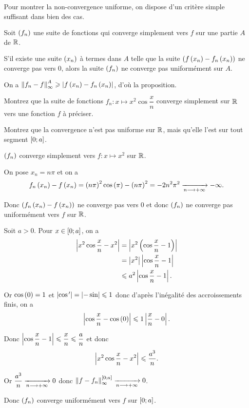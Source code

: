 Pour montrer la non-convergence uniforme, on dispose d'un critère simple suffisant dans bien des cas.

\begin{prop}
Soit \(\left(f_n\right)\) une suite de fonctions qui converge simplement vers \(f\) sur une partie \(A\) de \(\mathbb{R}\).

S'il existe une suite \(\left(x_n\right)\) à termes dans \(A\) telle que la suite \(\left(f\left(x_n\right)-f_n\left(x_n\right)\right)\) ne converge pas vers \(0\), alors la suite \(\left(f_n\right)\) ne converge pas uniformément sur \(A\).
\end{prop}

\begin{dem}
On a \(\norme{f_n-f}_\infty^A\geq\abs{f\paren{x_n}-f_n\paren{x_n}}\), d'où la proposition.
\end{dem}

\begin{exo}
Montrez que la suite de fonctions \(f_n:x\mapsto x^2\cos\dfrac{x}{n}\) converge simplement sur \(\mathbb{R}\) vers une fonction \(f\) à préciser.

Montrez que la convergence n'est pas uniforme sur \(\mathbb{R}\), mais qu'elle l'est sur tout segment \(\left[0;a\right]\).
\end{exo}

\begin{corr}
\(\left(f_n\right)\) converge simplement vers \(f:x\mapsto x^2\) sur \(\mathbb{R}\).

On pose \(x_n=n\pi\) et on a \[f_n\left(x_n\right)-f\left(x_n\right)=\left(n\pi\right)^2\cos\left(\pi\right)-\left(n\pi\right)^2=-2n^2\pi^2\xrightarrow[n\longrightarrow+\infty]{}-\infty.\]

Donc \(\left(f_n\left(x_n\right)-f\left(x_n\right)\right)\) ne converge pas vers \(0\) et donc \(\left(f_n\right)\) ne converge pas uniformément vers \(f\) sur \(\mathbb{R}\).

Soit \(a>0\). Pour \(x\in\left[0;a\right]\), on a \[\begin{aligned}
\left\lvert x^2\cos\dfrac{x}{n}-x^2\right\rvert&=\left\lvert x^2\left(\cos\dfrac{x}{n}-1\right)\right\rvert \\
&=\left\lvert x^2\right\rvert\left\lvert\cos\dfrac{x}{n}-1\right\rvert \\
&\leqslant a^2\left\lvert\cos\dfrac{x}{n}-1\right\rvert.
\end{aligned}\]

Or \(\cos\left(0\right)=1\) et \(\left\lvert\cos^{\,\prime}\right\rvert=\left\lvert-\sin\right\rvert\leqslant1\) donc d'après l'inégalité des accroissements finis, on a \[\left\lvert\cos\dfrac{x}{n}-\cos\left(0\right)\right\rvert\leqslant1\left\lvert\dfrac{x}{n}-0\right\rvert.\]

Donc \(\left\lvert\cos\dfrac{x}{n}-1\right\rvert\leqslant\dfrac{x}{n}\leqslant\dfrac{a}{n}\) et donc \[\left\lvert x^2\cos\dfrac{x}{n}-x^2\right\rvert\leqslant\dfrac{a^3}{n}.\]

Or \(\dfrac{a^3}{n}\xrightarrow[n\longrightarrow+\infty]{}0\) donc \(\norme{f-f_n}_\infty^{\intervii{0}{a}}\tendqd{n\to\pinf}0\).

Donc \(\left(f_n\right)\) converge uniformément vers \(f\) sur \(\left[0;a\right]\).
\end{corr}

